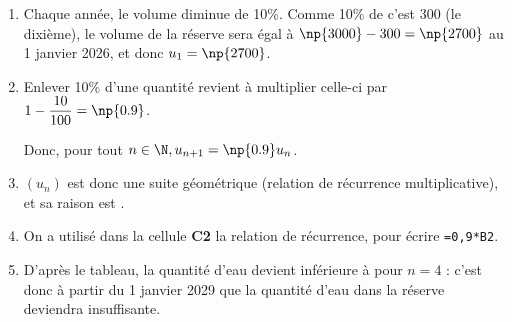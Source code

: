 \begin{enumerate}
  \item 

Chaque année, le volume diminue de 10\%. Comme 10\% de  c'est 300 (le dixième), le volume de la réserve sera égal à \mbox{$\np{3000}-300=\np{2700}$} au 1 janvier 2026, et donc \mbox{$u_1=\np{2700}$}.
  \item 

Enlever 10\% d'une quantité revient à multiplier celle-ci par \mbox{$1-\dfrac{10}{100}=\np{0.9}$}.

Donc, pour tout \mbox{$n \in \N, u_{n+1}=\np{0.9}u_n$}.
  \item 

\mbox{$(u_n)$} est donc une suite géométrique (relation de récurrence multiplicative), et sa raison est .
  \item 





















On a utilisé dans la cellule \textbf{C2} la relation de récurrence, pour écrire \texttt{=0,9*B2}.
  \item 



D'après le tableau, la quantité d'eau devient inférieure à  pour \mbox{$n=4$} : c'est donc à partir du 1 janvier 2029 que la quantité d’eau dans la réserve deviendra insuffisante.
\end{enumerate}  


